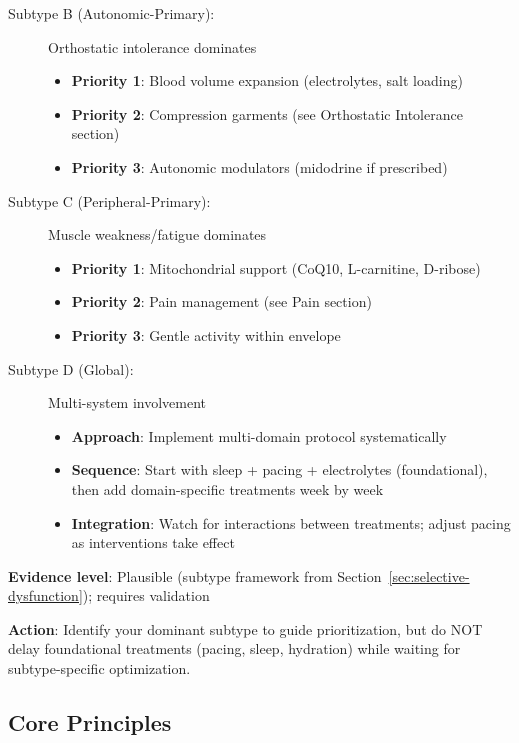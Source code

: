 \begin{recommendation}
\begin{description}
    \item[Subtype B (Autonomic-Primary):] Orthostatic intolerance dominates
    \begin{itemize}
        \item \textbf{Priority 1}: Blood volume expansion (electrolytes, salt loading)
        \item \textbf{Priority 2}: Compression garments (see Orthostatic Intolerance section)
        \item \textbf{Priority 3}: Autonomic modulators (midodrine if prescribed)
    \end{itemize}

    \item[Subtype C (Peripheral-Primary):] Muscle weakness/fatigue dominates
    \begin{itemize}
        \item \textbf{Priority 1}: Mitochondrial support (CoQ10, L-carnitine, D-ribose)
        \item \textbf{Priority 2}: Pain management (see Pain section)
        \item \textbf{Priority 3}: Gentle activity within envelope
    \end{itemize}

    \item[Subtype D (Global):] Multi-system involvement
    \begin{itemize}
        \item \textbf{Approach}: Implement multi-domain protocol systematically
        \item \textbf{Sequence}: Start with sleep + pacing + electrolytes (foundational), then add domain-specific treatments week by week
        \item \textbf{Integration}: Watch for interactions between treatments; adjust pacing as interventions take effect
    \end{itemize}
\end{description}

\textbf{Evidence level}: Plausible (subtype framework from Section~\ref{sec:selective-dysfunction}); requires validation

\textbf{Action}: Identify your dominant subtype to guide prioritization, but do NOT delay foundational treatments (pacing, sleep, hydration) while waiting for subtype-specific optimization.

\end{recommendation}

\subsection{Core Principles}


